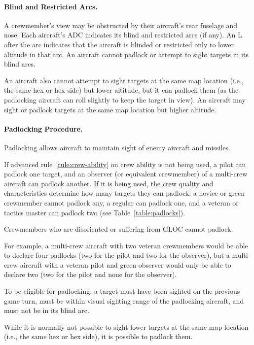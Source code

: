 {\paragraph{Blind and Restricted Arcs.} A crewmember’s view may be obstructed by their aircraft’s rear fuselage and nose. Each aircraft’s ADC indicates its blind and restricted arcs (if any). An L after the arc indicates that the aircraft is blinded or restricted only to lower altitude in that arc. An aircraft cannot padlock or attempt to sight targets in its blind arcs. 

An aircraft also cannot attempt to sight targets at the same map location (i.e., the same hex or hex side) but lower altitude, but it can padlock them (as the padlocking aircraft can roll slightly to keep the target in view). An aircraft may sight or padlock targets at the same map location but higher altitude.

\paragraph{Padlocking Procedure.}

Padlocking allows aircraft to maintain sight of enemy aircraft and missiles.

If advanced rule~\ref{rule:crew-ability} on crew ability is not being used, a pilot can padlock one target, and an observer (or equivalent crewmember) of a multi-crew aircraft can padlock another. If it is being used, the crew quality and characteristics determine how many targets they can padlock: a novice or green crewmember cannot padlock any, a regular can padlock one, and a veteran or tactics master can padlock two (see Table~\ref{table:padlocks}). 

Crewmembers who are disoriented or suffering from GLOC cannot padlock.

For example, a multi-crew aircraft with two veteran crewmembers would be able to declare four padlocks (two for the pilot and two for the observer), but a multi-crew aircraft with a veteran pilot and green observer would only be able to declare two (two for the pilot and none for the observer).

To be eligible for padlocking, a target must have been sighted on the previous game turn, must be within visual sighting range of the padlocking aircraft, and must not be in its blind arc. 

While it is normally not possible to sight lower targets at the same map location (i.e., the same hex or hex side), it is possible to padlock them.

}
